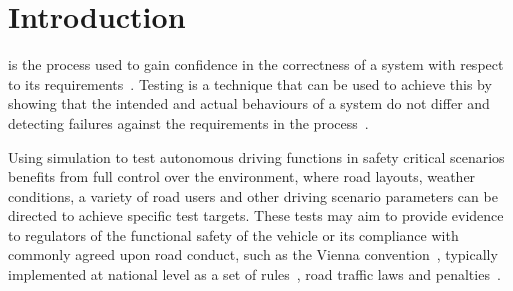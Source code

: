 \documentclass[letterpaper, 10 pt, journal, twoside]{IEEEtran}
\begin{document}
\section{Introduction}

 is the process used to gain confidence in the correctness of a system with respect to its requirements~\cite{bergeron2012writing}. Testing is a technique that can be used to achieve this by showing that the intended and actual behaviours of a system do not differ and detecting failures against the requirements in the process~\cite{utting2012taxonomy}.




Using simulation to test autonomous driving functions in safety critical scenarios benefits from full control over the environment, where road layouts, weather conditions, a variety of road users and other %
driving scenario parameters 
can be directed to achieve specific test targets. %
%
%
These tests may aim to provide evidence to regulators of the functional safety of the vehicle or its compliance with commonly agreed upon road conduct, such as the Vienna convention~\cite{ViennaConv}, typically implemented at national level as a set of rules~\cite{codes2015highway}, road traffic laws and penalties~\cite{RoadTraffic1988}.
%
\end{document}
